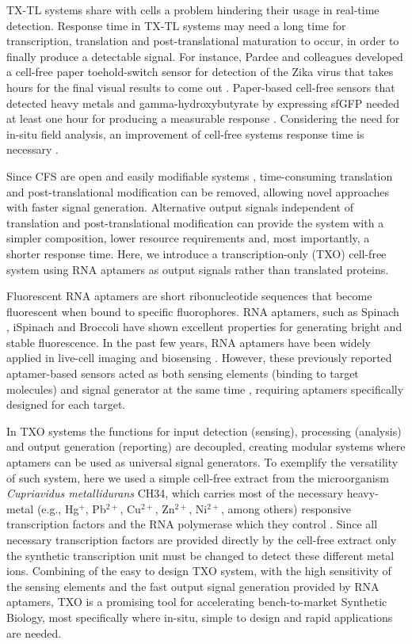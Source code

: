 TX-TL systems share with cells a problem hindering their usage in real-time detection. Response time in TX-TL systems may need a long time for transcription, translation and post-translational maturation to occur, in order to finally produce a detectable signal. For instance, Pardee and colleagues \cite{7} developed a cell-free paper toehold-switch sensor for detection of the Zika virus that takes hours for the final visual results to come out \cite{6}. Paper-based cell-free sensors that detected heavy metals and gamma-hydroxybutyrate by expressing sfGFP needed at least one hour for producing a measurable response \cite{8}. Considering the need for in-situ field analysis, an improvement of cell-free systems response time is necessary \cite{9,10}. 

Since CFS are open and easily modifiable systems \cite{11}, time-consuming translation and post-translational modification can be removed, allowing novel approaches with faster signal generation. Alternative output signals independent of translation and post-translational modification can provide the system with a simpler composition, lower resource requirements and, most importantly, a shorter response time. Here, we introduce a transcription-only (TXO) cell-free system using RNA aptamers as output signals rather than translated proteins. 

Fluorescent RNA aptamers are short ribonucleotide sequences that become fluorescent when bound to specific fluorophores. RNA aptamers, such as Spinach \cite{12}, iSpinach \cite{13} and Broccoli \cite{14} have shown excellent properties for generating bright and stable fluorescence. In the past few years, RNA aptamers have been widely applied in live-cell imaging \cite{15} and biosensing \cite{16}. However, these previously reported aptamer-based sensors acted as both sensing elements (binding to target molecules) and signal generator at the same time \cite{17,18}, requiring aptamers specifically designed for each target.

In TXO systems the functions for input detection (sensing), processing (analysis) and output generation (reporting) are decoupled, creating modular systems where aptamers can be used as universal signal generators. To exemplify the versatility of such system, here we used a simple cell-free extract from the microorganism \textit{Cupriavidus metallidurans} CH34, which carries most of the necessary heavy-metal (e.g., Hg$^{+}$, Pb$^{2+}$, Cu$^{2+}$, Zn$^{2+}$, Ni$^{2+}$, among others) responsive transcription factors and the RNA polymerase which they control \cite{19}. Since all necessary transcription factors are provided directly by the cell-free extract only the synthetic transcription unit must be changed to detect these different metal ions. Combining of the easy to design TXO system, with the high sensitivity of the sensing elements and the fast output signal generation provided by RNA aptamers, TXO is a promising tool for accelerating bench-to-market Synthetic Biology, most specifically where in-situ, simple to design and rapid applications are needed.

